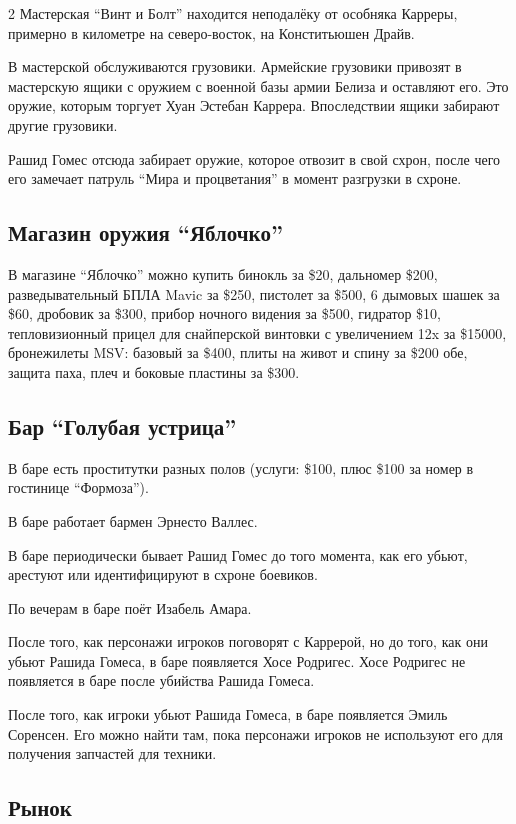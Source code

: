 \documentclass[twoside]{article}
\begin{document}
\begin{multicols}{2}
Мастерская \enquote{Винт и Болт} находится неподалёку от особняка Карреры,
примерно в километре на северо-восток, на Конститьюшен Драйв.

В мастерской обслуживаются грузовики. Армейские грузовики привозят в
мастерскую ящики с оружием с военной базы армии Белиза и оставляют его.
Это оружие, которым торгует Хуан Эстебан Каррера. Впоследствии ящики
забирают другие грузовики.

Рашид Гомес отсюда забирает оружие, которое отвозит в свой схрон, после
чего его замечает патруль \enquote{Мира и процветания} в момент разгрузки в
схроне.

\subsection{Магазин оружия \enquote{Яблочко}}\label{weapon-shop-yablochko}

В магазине \enquote{Яблочко} можно купить бинокль за \$20, дальномер \$200,
разведывательный БПЛА Mavic за \$250, пистолет за \$500, 6 дымовых шашек
за \$60, дробовик за \$300, прибор ночного видения за \$500, гидратор
\$10, тепловизионный прицел для снайперской винтовки с увеличением 12x
за \$15000, бронежилеты MSV: базовый за \$400, плиты на живот и спину за
\$200 обе, защита паха, плеч и боковые пластины за \$300.

\subsection{Бар \enquote{Голубая устрица}}\label{blue-oyster-bar}

В баре есть проститутки разных полов (услуги: \$100, плюс \$100 за
номер в гостинице \enquote{Формоза}).

В баре работает бармен Эрнесто Валлес.

В баре периодически бывает Рашид Гомес до того момента, как его убьют,
арестуют или идентифицируют в схроне боевиков.

По вечерам в баре поёт Изабель Амара.

После того, как персонажи игроков поговорят с Каррерой, но до того, как
они убьют Рашида Гомеса, в баре появляется Хосе Родригес. Хосе Родригес
не появляется в баре после убийства Рашида Гомеса.

После того, как игроки убьют Рашида Гомеса, в баре появляется Эмиль
Соренсен. Его можно найти там, пока персонажи игроков не используют его
для получения запчастей для техники.

\subsection{Рынок}\label{market}


\end{multicols}
\end{document}
